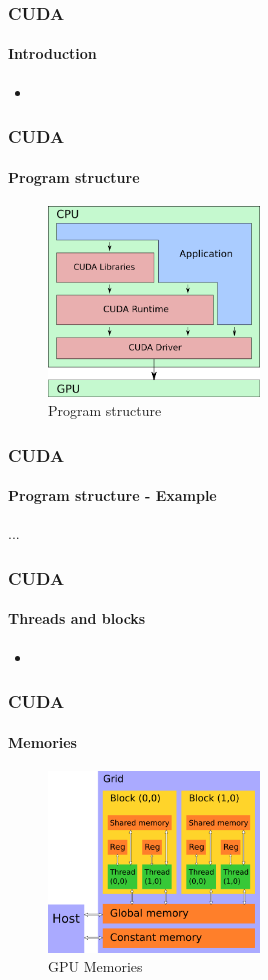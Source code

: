 \begin{frame}
    \frametitle{CUDA}
    \framesubtitle{Introduction}
    \begin{itemize}
        \item 
    \end{itemize}
\end{frame}

\begin{frame}
    \frametitle{CUDA}
    \framesubtitle{Program structure}
    \begin{figure}
        \centering
        \label{fig:cuda-structure}
        \includegraphics[width=0.5\textwidth]{img/cuda-structure}
        \caption{Program structure}
    \end{figure}
\end{frame}

\begin{frame}
    \frametitle{CUDA}
    \framesubtitle{Program structure - Example}

    ...
\end{frame}



\begin{frame}
    \frametitle{CUDA}
    \framesubtitle{Threads and blocks}
    \begin{itemize}
        \item 
    \end{itemize}
\end{frame}

\begin{frame}
    \frametitle{CUDA}
    \framesubtitle{Memories}
    \begin{figure}
        \centering
        \label{fig:cuda-memories}
        \includegraphics[width=0.5\textwidth]{img/cuda-memories}
        \caption{GPU Memories}
    \end{figure}
\end{frame}

